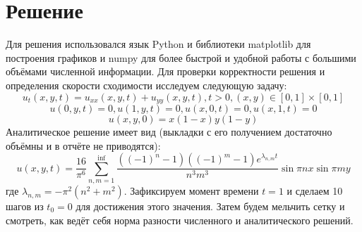 \documentclass[paper=a4, fontsize=13pt]{scrartcl} %
\numberwithin{equation}{section} %
\numberwithin{figure}{section} %
\numberwithin{table}{section} %
\begin{document}
\section{Решение}
Для решения использовался язык Python и библиотеки matplotlib для построения графиков и numpy для более быстрой и удобной работы с большими объёмами численной информации.
Для проверки корректности решения и определения скорости сходимости исследуем следующую задачу:
$$u_t(x, y, t) = u_{xx}(x, y, t) + u_{yy}(x, y, t), t > 0, (x, y) \in [0, 1] \times [0, 1]$$
$$u(0, y, t) = 0, u(1, y, t) = 0, u(x, 0, t) = 0, u(x, 1, t) = 0$$
$$u(x, y, 0) = x(1 - x)y(1-y)$$
Аналитическое решение имеет вид (выкладки с его получением достаточно объёмны и в отчёте не приводятся):
$$u(x, y, t) = \frac{16}{\pi^6} \sum^{\inf}_{n,m=1} \frac{((-1)^n - 1)((-1)^m - 1)e^{\lambda_{n,m}t}}{n^3m^3} \sin{\pi n x} \sin{\pi m y}$$
где $\lambda_{n,m} = - \pi^2(n^2 + m^2)$. Зафиксируем момент времени $t = 1$ и сделаем 10 шагов из $t_0 = 0$ для достижения этого значения. Затем будем мельчить сетку и смотреть, как ведёт себя норма разности численного и аналитического решений.
\end{document}
